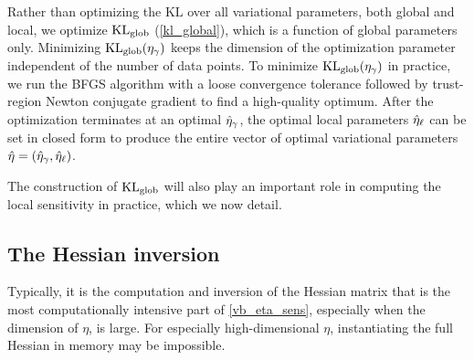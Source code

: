 Rather than optimizing the $\mathrm{KL}$ over all variational parameters, both global and local,
we optimize $\mathrm{KL}_{\mathrm{glob}}$ (\eqref{kl_global}), which is a function of global parameters only.
Minimizing $\mathrm{KL}_{\mathrm{glob}}(\eta_{\gamma})$ keeps the
dimension of the optimization parameter independent of the number of data points.
To minimize $\mathrm{KL}_{\mathrm{glob}}(\eta_{\gamma})$ in practice,
we run the BFGS algorithm with a loose convergence tolerance
followed by trust-region Newton conjugate gradient \citep[Chapter~7]{nocedal:2006:numerical}
to find a high-quality optimum.
After the optimization terminates at an optimal $\hat\eta_{\gamma}$,
the optimal local parameters $\hat\eta_{\ell}$ can be set in closed form
to produce the entire vector of optimal variational parameters $\hat\eta = (\hat\eta_{\gamma}, \hat\eta_{\ell})$.

The construction of $\mathrm{KL}_{\mathrm{glob}}$ will also play an
important role in computing the local sensitivity in practice,
which we now detail.





\subsection{The Hessian inversion}

Typically, it is the computation and inversion of the Hessian matrix that is
the most computationally intensive part of \eqref{vb_eta_sens}, especially when
the dimension of $\eta$, is large.
For especially high-dimensional $\eta$,
instantiating the full Hessian in memory
may be impossible.

